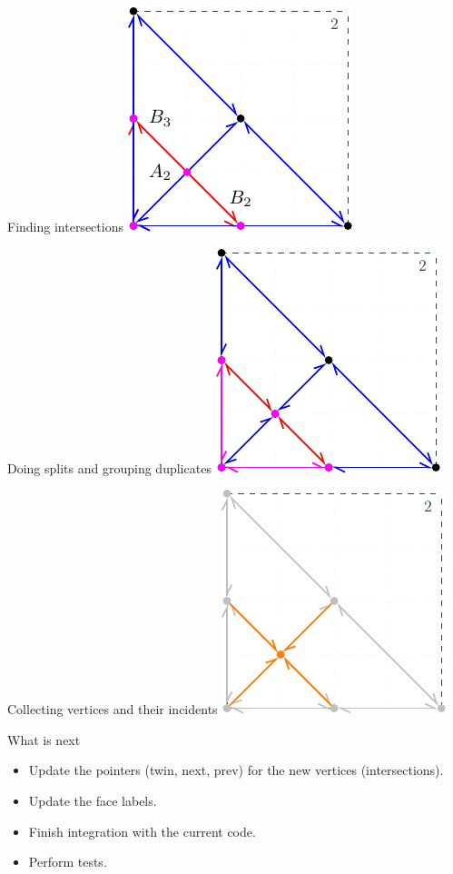 \documentclass{beamer}
\begin{document}
\begin{frame}{Finding intersections}
    \centering 
    \includegraphics[width=0.6\linewidth]{figures/Part2Intersections} 
\end{frame}

\begin{frame}{Doing splits and grouping duplicates}
    \centering 
    \includegraphics[width=0.6\linewidth]{figures/Part2Splits} 
\end{frame}

\begin{frame}{Collecting vertices and their incidents}
    \centering 
    \includegraphics[width=0.6\linewidth]{figures/Part2Incidents} 
\end{frame}

\begin{frame}{What is next}
    \begin{itemize}
        \item Update the pointers (twin, next, prev) for the new vertices (intersections).
        \item Update the face labels.
        \item Finish integration with the current code.
        \item Perform tests.
    \end{itemize}
\end{frame}
\end{document}
